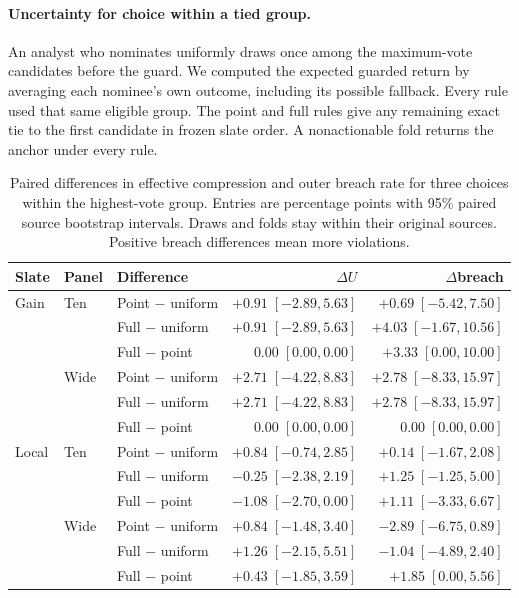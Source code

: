 \paragraph{Uncertainty for choice within a tied group.}
An analyst who nominates uniformly draws once among the maximum-vote candidates before the guard. We computed the expected guarded return by averaging each nominee's own outcome, including its possible fallback. Every rule used that same eligible group. The point and full rules give any remaining exact tie to the first candidate in frozen slate order. A nonactionable fold returns the anchor under every rule.

\begin{table}[ht]
\centering\small
\caption{Paired differences in effective compression and outer breach rate for three choices within the highest-vote group. Entries are percentage points with 95\% paired source bootstrap intervals. Draws and folds stay within their original sources. Positive breach differences mean more violations.}
\label{tab:within-tier-forest-contrasts}
\begin{tabular}{@{}ll l rr@{}}
\toprule
Slate & Panel & Difference & $\Delta U$ & $\Delta$breach\\
\midrule
Gain & Ten & Point $-$ uniform & $+0.91\;[-2.89,5.63]$ & $+0.69\;[-5.42,7.50]$\\
 & & Full $-$ uniform  & $+0.91\;[-2.89,5.63]$ & $+4.03\;[-1.67,10.56]$\\
 & & Full $-$ point    & $0.00\;[0.00,0.00]$ & $+3.33\;[0.00,10.00]$\\
 & Wide & Point $-$ uniform & $+2.71\;[-4.22,8.83]$ & $+2.78\;[-8.33,15.97]$\\
 & & Full $-$ uniform  & $+2.71\;[-4.22,8.83]$ & $+2.78\;[-8.33,15.97]$\\
 & & Full $-$ point    & $0.00\;[0.00,0.00]$ & $0.00\;[0.00,0.00]$\\
\midrule
Local & Ten & Point $-$ uniform & $+0.84\;[-0.74,2.85]$ & $+0.14\;[-1.67,2.08]$\\
 & & Full $-$ uniform  & $-0.25\;[-2.38,2.19]$ & $+1.25\;[-1.25,5.00]$\\
 & & Full $-$ point    & $-1.08\;[-2.70,0.00]$ & $+1.11\;[-3.33,6.67]$\\
 & Wide & Point $-$ uniform & $+0.84\;[-1.48,3.40]$ & $-2.89\;[-6.75,0.89]$\\
 & & Full $-$ uniform  & $+1.26\;[-2.15,5.51]$ & $-1.04\;[-4.89,2.40]$\\
 & & Full $-$ point    & $+0.43\;[-1.85,3.59]$ & $+1.85\;[0.00,5.56]$\\
\bottomrule
\end{tabular}
\end{table}

